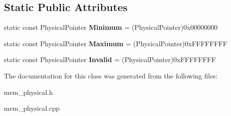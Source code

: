 \subsection*{Static Public Attributes}
\begin{DoxyCompactItemize}
\item 
\mbox{\label{class_c_physical_memory_a3f9cecd1fef0d4db190de9c6efa7a945}} 
static const Physical\+Pointer {\bfseries Minimum} = (Physical\+Pointer)0x00000000
\item 
\mbox{\label{class_c_physical_memory_a00a8ccd7af579f6edbb149b83c810272}} 
static const Physical\+Pointer {\bfseries Maximum} = (Physical\+Pointer)0x\+F\+F\+F\+F\+F\+F\+FF
\item 
\mbox{\label{class_c_physical_memory_ab0a514a423cbe11bf7a79c15ac3d31de}} 
static const Physical\+Pointer {\bfseries Invalid} = (Physical\+Pointer)0x\+F\+F\+F\+F\+F\+F\+FF
\end{DoxyCompactItemize}


The documentation for this class was generated from the following files\+:\begin{DoxyCompactItemize}
\item 
mem\+\_\+physical.\+h\item 
mem\+\_\+physical.\+cpp\end{DoxyCompactItemize}
